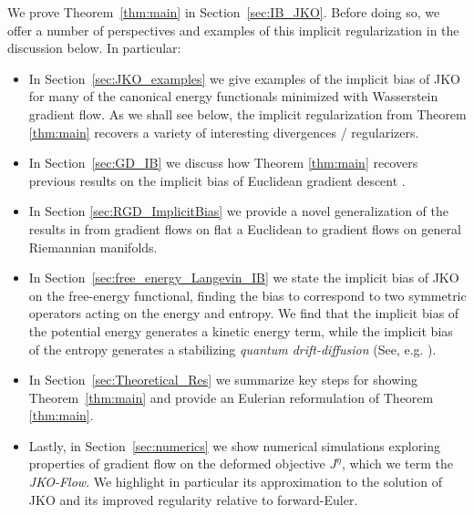 \documentclass[reqno,11pt,letterpaper]{amsart}
\theoremstyle{plain}
\theoremstyle{definition}
\theoremstyle{remark}
\begin{document}
We prove Theorem~\ref{thm:main} in Section~\ref{sec:IB_JKO}. Before doing so, we offer a number of perspectives and examples of this implicit regularization in the discussion below. In particular:
\begin{itemize}
    \item In Section~\ref{sec:JKO_examples} we give examples of the implicit bias of JKO for many of the canonical energy functionals minimized with Wasserstein gradient flow. As we shall see below, the implicit regularization from Theorem \ref{thm:main} recovers a variety of interesting divergences / regularizers.
    \item In Section~\ref{sec:GD_IB} we discuss how Theorem \ref{thm:main} recovers previous results on the implicit bias of Euclidean gradient descent \cite{smith2021on, barrett2021implicit}.
    \item In Section \ref{sec:RGD_ImplicitBias} we provide a novel generalization of the results in \cite{smith2021on, barrett2021implicit} from gradient flows on flat a Euclidean to gradient flows on general Riemannian manifolds. 
    \item In Section~\ref{sec:free_energy_Langevin_IB} we state the implicit bias of JKO on the free-energy functional, finding the bias to correspond to two symmetric operators acting on the energy and entropy. We find that the implicit bias of the potential energy generates a kinetic energy term, while the implicit bias of the entropy generates a stabilizing \emph{quantum drift-diffusion} (See, e.g. \cite{Gianazza2008}).
    \item In Section~\ref{sec:Theoretical_Res} we summarize key steps for showing Theorem~\ref{thm:main} and provide an Eulerian reformulation of Theorem \ref{thm:main}. 
    \item Lastly, in Section~\ref{sec:numerics} we show numerical simulations exploring properties of gradient flow on the deformed objective $J^\eta$, which we term the \emph{\textrm{JKO}-Flow}. We highlight in particular its approximation to the solution of JKO and its improved regularity relative to forward-Euler.
\end{itemize}

%
\end{document}
